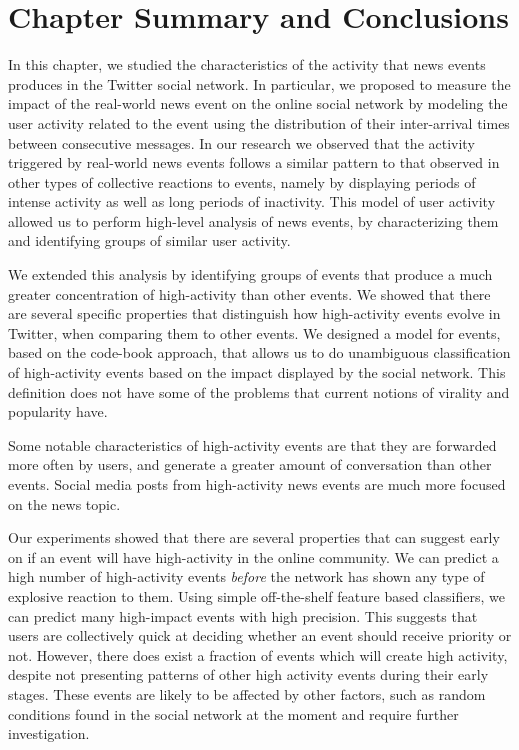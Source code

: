 \section{Chapter Summary and Conclusions}

In this chapter, we studied the characteristics of the activity that news events
produces in the Twitter social network. 
%
In particular, we proposed to measure the impact of the real-world news event on
the online social network by modeling the user activity related to the event
using the distribution of their inter-arrival times between consecutive
messages.
%
In our research we observed that the activity triggered by real-world news
events follows a similar pattern to that observed in other types of collective
reactions to events, 
%
namely by displaying periods of intense activity as well as long periods of
inactivity.
%
This model of user activity allowed us to perform high-level analysis of news
events, by characterizing them and identifying groups of similar user activity.


We extended this analysis by identifying groups of events that produce
a much greater concentration of high-activity than other events. 
%
We showed that there are several specific properties that distinguish how
high-activity events evolve in Twitter, when comparing them to other events. 
%
We designed a model for events, based on the code-book approach, that allows us to
do unambiguous classification of high-activity events based on the impact
displayed by the social network. 
%
This definition does not have some of the problems that current notions of
virality and popularity have. 
%


Some notable characteristics of high-activity events are that they are forwarded
more often by users, and generate a greater amount of conversation than other
events.
%
Social media posts from high-activity news events are much more focused on the
news topic. 
%


Our experiments showed that there are several properties that can suggest early on
if an event will have high-activity in the online community. 
%
We can predict a high number of high-activity events {\em before} the network
has shown any type of explosive reaction to them. 
%
Using simple off-the-shelf feature based classifiers, we can predict many
high-impact events with high precision. 
%
This suggests that users are collectively quick at deciding whether an event
should receive priority or not. 
%
However, there does exist a fraction of events which will create high activity,
despite not presenting patterns of other high activity events during their early
stages.
%
These events are likely to be affected by other factors, such as random
conditions found in the social network at the moment and require further
investigation.